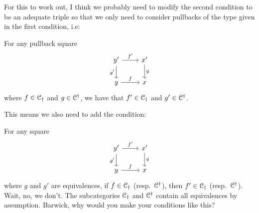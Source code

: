 \documentclass[main.tex]{subfiles}
\begin{document}
\begin{note}
  For this to work out, I think we probably need to modify the second condition to be an adequate triple so that we only need to consider pullbacks of the type given in the first condition, i.e:

  For any pullback square
  \begin{equation*}
    \begin{tikzcd}
      y'
      \arrow[r,  "f'"]
      \arrow[d, swap, "g'"]
      & x'
      \arrow[d, "g"]
      \\
      y
      \arrow[r, "f"]
      & x
    \end{tikzcd}
  \end{equation*}
  where $f \in \mathcal{C}_{\dagger}$ and $g \in \mathcal{C}^{\dagger}$, we have that $f' \in \mathcal{C}_{\dagger}$ and $g' \in \mathcal{C}^{\dagger}$.

  This means we also need to add the condition:

  For any square
  \begin{equation*}
    \begin{tikzcd}
      y'
      \arrow[r,  "f'"]
      \arrow[d, swap, "g'"]
      & x'
      \arrow[d, "g"]
      \\
      y
      \arrow[r, "f"]
      & x
    \end{tikzcd}
  \end{equation*}
  where $g$ and $g'$ are equivalences, if $f \in \mathcal{C}_{\dagger}$  (resp.\ $\mathcal{C}^{\dagger}$), then $f' \in \mathcal{C}_{\dagger}$ (resp.\ $\mathcal{C}^{\dagger}$). Wait, no, we don't. The subcategories $\mathcal{C}_{\dagger}$ and $\mathcal{C}^{\dagger}$ contain all equivalences by assumption. Barwick, why would you make your conditions like this?
\end{note}
\end{document}
